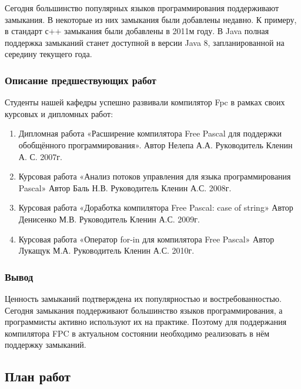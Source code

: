 \documentclass{imcs}
\begin{document}
Сегодня большинство популярных языков программирования поддерживают
замыкания. В некоторые из них замыкания были добавлены недавно. К
примеру, в стандарт с++ замыкания были добавлены в 2011м году. В Java
полная поддержка замыканий станет доступной в версии Java 8,
запланированной на середину текущего года.

\subsubsection{Описание предшествующих работ}
Студенты нашей кафедры успешно развивали компилятор Fpc в рамках своих
курсовых и дипломных работ:
\begin{enumerate}
    \item Дипломная работа «Расширение компилятора Free Pascal для поддержки обобщённого программирования». Автор Нелепа А.А. Руководитель Кленин А. С. 2007г.\cite{diplomnelepa}
    \item Курсовая работа «Анализ потоков управления для языка программирования Pascal» Автор Баль Н.В. Руководитель Кленин А.С. 2008г.\cite{coursebal}
    \item Курсовая работа «Доработка компилятора Free Pascal: case of string» Автор Денисенко М.В. Руководитель Кленин А.С. 2009г.\cite{misha}
    \item Курсовая работа «Оператор for-in для компилятора Free Pascal» Автор Лукащук М.А. Руководитель Кленин А.С. 2010г.\cite{courseluck}
\end{enumerate}

\subsubsection{Вывод}

Ценность замыканий подтверждена их популярностью и востребованностью. 
Сегодня замыкания поддерживают большинство языков программирования, а программисты 
активно используют их на практике. Поэтому для поддержания компилятора FPC в 
актуальном состоянии необходимо реализовать в нём поддержку замыканий.

\subsection{План работ}
\end{document}
